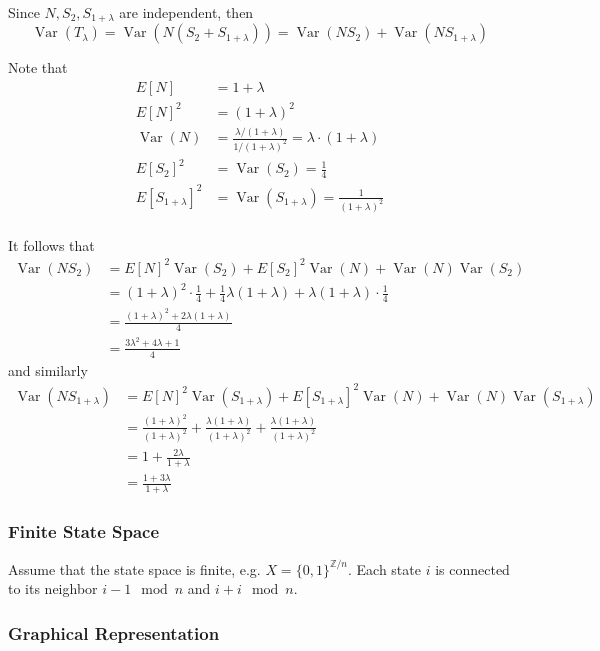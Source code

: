 \documentclass{article}
\theoremstyle{plain}
\theoremstyle{definition}
\theoremstyle{remark}
\newcommand{\Z}{\mathbb{Z}}
\newcommand{\Var}{\operatorname {Var}}
\begin{document}
Since $N, S_2, S_{1 + \lambda}$ are independent, then
$$
\Var(T_\lambda) = \Var(N(S_2 + S_{1 + \lambda})) = \Var(N S_2) + \Var(N S_{1 + \lambda})
$$

Note that
\begin{align*}
    E[N] &= 1 + \lambda\\
    E[N]^2 &= (1 + \lambda)^2\\
    \Var(N) &= \frac{\lambda / (1 + \lambda)}{1 / (1 + \lambda)^2} = \lambda \cdot (1 + \lambda)\\
    E[S_2]^2 &= \Var(S_2) = \frac{1}{4}\\
    E[S_{1 + \lambda}]^2 &= \Var(S_{1 + \lambda}) =  \frac{1}{(1 + \lambda)^2}\\
\end{align*}

It follows that
\begin{align*}
    \Var(N S_2) &= E[N]^2 \Var(S_2) + E[S_2]^2 \Var(N) + \Var(N) \Var(S_2)\\
    &= (1 + \lambda)^2 \cdot \frac{1}{4} + \frac{1}{4} \lambda (1 + \lambda) + \lambda  (1 + \lambda) \cdot \frac{1}{4}\\
    &= \frac{(1 + \lambda)^2 + 2 \lambda ( 1 + \lambda)}{4}\\
    &= \frac{3\lambda^2 + 4 \lambda + 1}{4}
\end{align*}
and similarly
\begin{align*}
    \Var(N S_{1 + \lambda}) &= E[N]^2 \Var(S_{1 + \lambda}) + E[S_{1 + \lambda}]^2 \Var(N) + \Var(N) \Var(S_{1 + \lambda})\\
    &= \frac{(1 + \lambda)^2}{(1 + \lambda)^2} + \frac{\lambda (1 + \lambda)}{(1 + \lambda)^2} + \frac{\lambda (1 + \lambda)}{(1 + \lambda)^2}\\
    &= 1 + \frac{2 \lambda}{1 + \lambda}\\
    &= \frac{1 + 3 \lambda}{1 + \lambda}
\end{align*}

\subsubsection{Finite State Space}
Assume that the state space is finite, e.g. $X = \{ 0,1 \}^{\Z / n}$.
Each state $i$ is connected to its neighbor $i - 1 \mod n$ and $i + i \mod n$.

\subsubsection{Graphical Representation}
\end{document}
